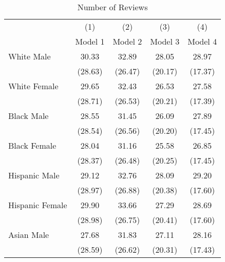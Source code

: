 \begin{table}[htbp]\centering
\def\sym#1{\ifmmode^{#1}\else\(^{#1}\)\fi}
\caption{Number of Reviews}
\begin{tabular}{l*{4}{c}}
\hline\hline
                    &\multicolumn{1}{c}{(1)}&\multicolumn{1}{c}{(2)}&\multicolumn{1}{c}{(3)}&\multicolumn{1}{c}{(4)}\\
                    &\multicolumn{1}{c}{Model 1}&\multicolumn{1}{c}{Model 2}&\multicolumn{1}{c}{Model 3}&\multicolumn{1}{c}{Model 4}\\
\hline
White Male          &       30.33         &       32.89         &       28.05         &       28.97         \\
                    &     (28.63)         &     (26.47)         &     (20.17)         &     (17.37)         \\
[1em]
White Female        &       29.65         &       32.43         &       26.53         &       27.58         \\
                    &     (28.71)         &     (26.53)         &     (20.21)         &     (17.39)         \\
[1em]
Black Male          &       28.55         &       31.45         &       26.09         &       27.89         \\
                    &     (28.54)         &     (26.56)         &     (20.20)         &     (17.45)         \\
[1em]
Black Female        &       28.04         &       31.16         &       25.58         &       26.85         \\
                    &     (28.37)         &     (26.48)         &     (20.25)         &     (17.45)         \\
[1em]
Hispanic Male       &       29.12         &       32.76         &       28.09         &       29.20         \\
                    &     (28.97)         &     (26.88)         &     (20.38)         &     (17.60)         \\
[1em]
Hispanic Female     &       29.90         &       33.66         &       27.29         &       28.69         \\
                    &     (28.98)         &     (26.75)         &     (20.41)         &     (17.60)         \\
[1em]
Asian Male          &       27.68         &       31.83         &       27.11         &       28.16         \\
                    &     (28.59)         &     (26.62)         &     (20.31)         &     (17.43)         \\

\end{tabular}
\end{table}
